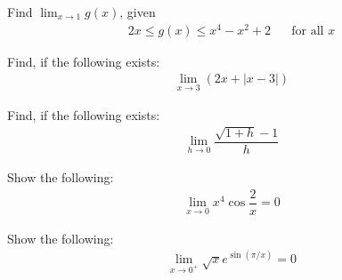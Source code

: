 \begin{exercise}
Find $\lim_{x \longrightarrow 1} g(x)$, given 
\begin{align*}
    2x \leq g(x) \leq x^{4} - x^{2} + 2 \hspace{20pt} \text{for all} \hspace{4pt} x
\end{align*}
\end{exercise}

\begin{exercise}
Find, if the following exists:
\begin{align*}
    \lim_{x \longrightarrow 3} (2x + \lvert x-3 \rvert)
\end{align*}
\end{exercise}

\begin{exercise}
Find, if the following exists:
\begin{align*}
    \lim_{h \longrightarrow 0} \dfrac{\sqrt{1+h} - 1}{h}
\end{align*}
\end{exercise}

\begin{exercise}
Show the following:
\begin{align*}
    \lim_{x \longrightarrow 0} x^{4} \cos \dfrac{2}{x} = 0
\end{align*}
\end{exercise}

\begin{exercise}
Show the following:
\begin{align*}
    \lim_{x \longrightarrow 0^{+}} \sqrt{x} e^{\sin (\pi/x)} = 0
\end{align*}
\end{exercise}